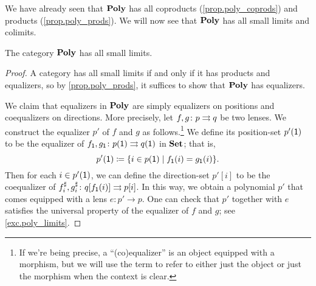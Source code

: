 \documentclass[Book-Poly]{subfiles}
\begin{document}
We have already seen that $\mathbf{Poly}$ has all coproducts (\cref{prop.poly_coprods}) and products (\cref{prop.poly_prods}).
We will now see that $\mathbf{Poly}$ has all small limits and colimits.

\begin{theorem}\label{thm.poly_limits}
The category $\mathbf{Poly}$ has all small limits.
\end{theorem}
\begin{proof}
A category has all small limits if and only if it has products and equalizers, so by \cref{prop.poly_prods}, it suffices to show that $\mathbf{Poly}$ has equalizers.

We claim that equalizers in $\mathbf{Poly}$ are simply equalizers on positions and coequalizers on directions.
More precisely, let $f,g \colon p \rightrightarrows q$ be two lenses.
We construct the equalizer $p'$ of $f$ and $g$ as follows.\footnote{If we're being precise, a ``(co)equalizer'' is an object equipped with a morphism, but we will use the term to refer to either just the object or just the morphism when the context is clear.}
We define its position-set $p'(\textsf{1})$ to be the equalizer of $f_{\textsf{1}},g_{\textsf{1}} \colon p(\textsf{1}) \rightrightarrows q(\textsf{1})$ in $\mathbf{Set}$; that is,
\[
    p'(\textsf{1}) \coloneqq \{i \in p(\textsf{1}) \mid f_{\textsf{1}}(i) = g_{\textsf{1}}(i)\}.
\]
Then for each $i \in p'(\textsf{1})$, we can define the direction-set $p'[i]$ to be the coequalizer of $f^\sharp_i, g^\sharp_i \colon q[f_{\textsf{1}}(i)] \rightrightarrows p[i]$.
In this way, we obtain a polynomial $p'$ that comes equipped with a lens $e \colon p' \to p$.
One can check that $p'$ together with $e$ satisfies the universal property of the equalizer of $f$ and $g$; see \cref{exc.poly_limits}.
\end{proof}
\end{document}

